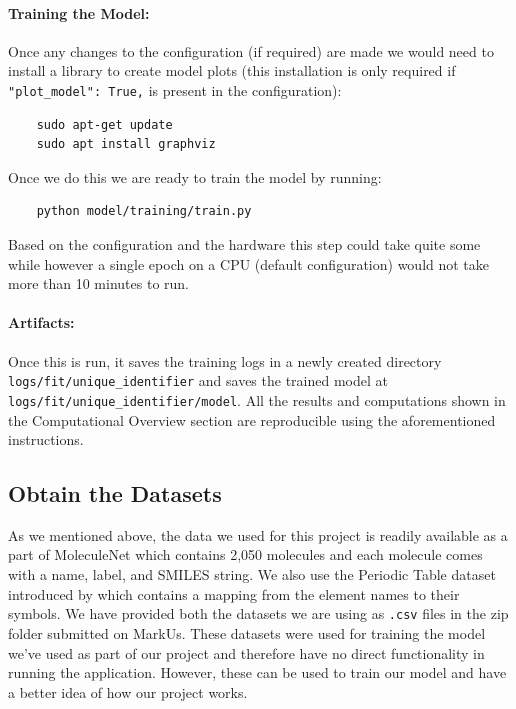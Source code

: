 \documentclass[fontsize=11pt]{article}
\begin{document}
\paragraph{Training the Model:} Once any changes to the configuration (if required) are made we would need to install a library to create model plots (this installation is only required if \texttt{"plot\_model": True,} is present in the configuration):

\begin{verbatim}
    sudo apt-get update
    sudo apt install graphviz
\end{verbatim}

Once we do this we are ready to train the model by running:

\begin{verbatim}
    python model/training/train.py
\end{verbatim}

Based on the configuration and the hardware this step could take quite some while however a single epoch on a CPU (default configuration) would not take more than 10 minutes to run.

\paragraph{Artifacts:} Once this is run, it saves the training logs in a newly created directory \texttt{logs/fit/unique\_identifier} and saves the trained model at \texttt{logs/fit/unique\_identifier/model}. All the results and computations shown in the Computational Overview section are reproducible using the aforementioned instructions.

\subsection*{Obtain the Datasets}

As we mentioned above, the data we used for this project is readily available as a part of MoleculeNet \citep{wu2018moleculenet} which contains 2,050 molecules and each molecule comes with a name, label, and SMILES string. We also use the Periodic Table dataset introduced by \cite{periodicdataset} which contains a mapping from the element names to their symbols. We have provided both the datasets we are using as \texttt{.csv} files in the zip folder submitted on MarkUs. These datasets were used for training the model we've used as part of our project and therefore have no direct functionality in running the application. However, these can be used to train our model and have a better idea of how our project works.
\end{document}
